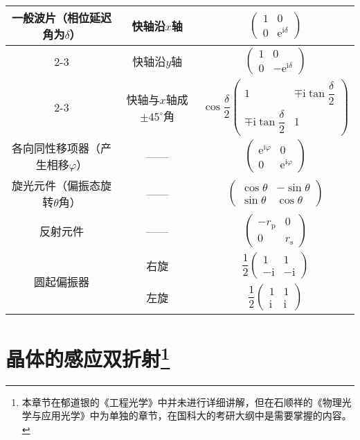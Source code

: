 \documentclass[cn,10pt,chinesefont=founder,math=mtpro2,cite=super,toc=onecol,twoside,openany]{elegantbook}
\begin{document}
\begin{table}[htbp]
\begin{tabular}{c|c|c}
			\hline
			\multirow{7}{*}{一般波片（相位延迟角为$\delta$）}& 快轴沿$x$轴 & $\begin{pmatrix} 1&0\\ 0&\mathrm{e}^{\mathrm{i}\delta} \end{pmatrix}$\\
			\cline{2-3}
			& 快轴沿$y$轴 & $\begin{pmatrix} 1&0\\ 0&-\mathrm{e}^{\mathrm{i}\delta} \end{pmatrix}$\\
			\cline{2-3}
			& 快轴与$x$轴成$\pm45^{\circ}$角 & $\cos\dfrac{\delta}{2}\begin{pmatrix} 1&\mp\mathrm{i}\tan\dfrac{\delta}{2}\\ \mp\mathrm{i}\tan\dfrac{\delta}{2}&1 \end{pmatrix}$\\
			\hline
			各向同性移项器（产生相移$\varphi$）& —— & $\begin{pmatrix} \mathrm{e}^{\mathrm{i}\varphi}&0\\ 0&\mathrm{e}^{\mathrm{i}\varphi} \end{pmatrix}$\\
			\hline
			旋光元件（偏振态旋转$\theta$角）& —— & $\begin{pmatrix} \cos\theta&-\sin\theta\\ \sin\theta&\cos\theta \end{pmatrix}$\\
			\hline
			反射元件& —— & $\begin{pmatrix} -r_{\mathrm{p}}&0\\ 0&r_{\mathrm{s}} \end{pmatrix}$\\
			\hline
			\multirow{3}{*}{圆起偏振器}& 右旋 & $\dfrac{1}{2}\begin{pmatrix} 1&1\\ -\mathrm{i}&-\mathrm{i} \end{pmatrix}$\\
			\cline{2-3}
			& 左旋 & $\dfrac{1}{2}\begin{pmatrix} 1&1\\ \mathrm{i}&\mathrm{i} \end{pmatrix}$\\
			\hline
		\end{tabular}
	\label{tab:jones-matrix-of-typical-polarizers}
\end{table}

\chapter{晶体的感应双折射\footnote{本章节在郁道银的《工程光学》中并未进行详细讲解，但在石顺祥的《物理光学与应用光学》中为单独的章节，在国科大的考研大纲中是需要掌握的内容。}}
\end{document}
